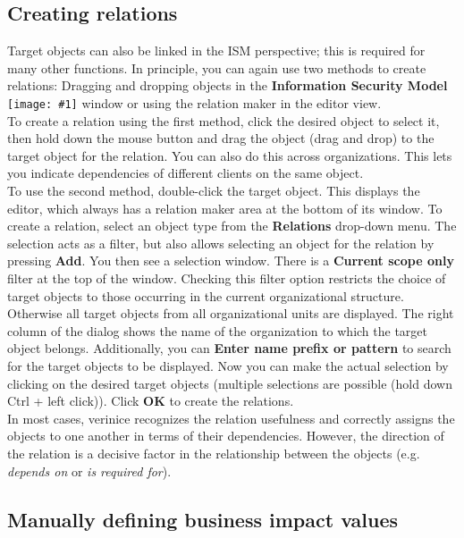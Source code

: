 \documentclass[a4paper,10pt]{book}
\newcommand{\icon}[1]{\texttt{[image: \#1]}}
\begin{document}
\subsection{Creating relations}
\label{sec:ismView_dd}
Target objects can also be linked in the ISM perspective; this is required for many other functions. In principle, you can again use two methods to create relations:
Dragging and dropping objects in the
\textbf{Information Security Model} \icon{Icon/Informationssicherheitsmodell.png}
window or using the relation maker in the editor view.
\newline\\
To create a relation using the first method, click the desired object to select it, then hold down
the mouse button and drag the object (drag and drop) to the target object for the relation. You can
also do this across organizations. This lets you indicate dependencies of different clients on
the same object.
\newline\\
To use the second method, double-click the target object. This displays the editor, which always has a relation maker area at the bottom of its window.
To create a relation, select an object type from the \textbf{Relations}
drop-down menu. The selection acts as a filter, but also allows selecting an object for the relation by pressing
\textbf{Add}. You then see a selection window. There is a \textbf{Current scope only} filter at the top of the window. Checking this filter option restricts
the choice of target objects to those occurring in the current organizational structure. Otherwise all target
objects from all organizational units are displayed. The right column of the dialog shows the name of the organization to which the target object belongs. Additionally, you can \textbf{Enter name prefix or pattern}
to search for the target objects to be displayed. Now you can make the actual selection by clicking on the desired target objects (multiple selections
are possible (hold down Ctrl + left click)). Click \textbf{OK} to create the relations.
\newline\\
In most cases, verinice recognizes the relation usefulness and correctly assigns the objects to one another in terms of their dependencies. However,
the direction of the relation is a decisive factor in the relationship between the objects (e.g. {\em depends on} or
{\em is required for}).

\subsection{Manually defining business impact values}
\end{document}
